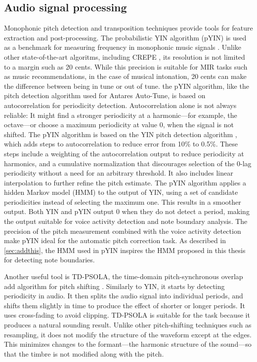 \subsection{Audio signal processing}
Monophonic pitch detection and transposition techniques provide tools for feature extraction and post-processing. The probabilistic YIN algorithm (pYIN) \cite{mauch2014pyin} is used as a benchmark for measuring frequency in monophonic music signals \cite{devaney2020new}. Unlike other state-of-the-art algoritms, including CREPE \cite{kim2018crepe}, its resolution is not limited to a margin such as 20 cents. While this precision is suitable for MIR tasks such as music recommendations, in the case of musical intonation, 20 cents can make the difference between being in tune or out of tune. the pYIN algorithm, like the pitch detection algorithm used for Antares Auto-Tune, is based on autocorrelation for periodicity detection. Autocorrelation alone is not always reliable: It might find a stronger periodicity at a harmonic---for example, the octave---or choose a maximum periodicity at value 0, when the signal is not shifted. The pYIN algorithm is based on the YIN pitch detection algorithm \cite{de2002yin}, which adds steps to autocorrelation to reduce error from 10\% to 0.5\%. These steps include a weighting of the autocorrelation output to reduce periodicity at harmonics, and a cumulative normalization that discourages selection of the 0-lag periodicity without a need for an arbitrary threshold. It also includes linear interpolation to further refine the pitch estimate. The pYIN algorithm applies a hidden Markov model (HMM) to the output of YIN, using a set of candidate periodicities instead of selecting the maximum one. This results in a smoother output. Both YIN and pYIN output 0 when they do not detect a period, making the output suitable for voice activity detection and note boundary analysis. The precision of the pitch measurement combined with the voice activity detection make pYIN ideal for the automatic pitch correction task. As described in \ref{sec:addthis}, the HMM used in pYIN inspires the HMM proposed in this thesis for detecting note boundaries. 

Another useful tool is TD-PSOLA, the time-domain pitch-synchronous overlap add algorithm for pitch shifting \cite{charpentier1986diphone}. Similarly to YIN, it starts by detecting periodicity in audio. It then splits the audio signal into individual periods, and shifts them slightly in time to produce the effect of shorter or longer periods. It uses cross-fading to avoid clipping. TD-PSOLA is suitable for the task because it produces a natural sounding result. Unlike other pitch-shifting techniques such as resampling, it does not modify the structure of the waveform except at the edges. This minimizes changes to the formant---the harmonic structure of the sound---so that the timbre is not modified along with the pitch. 

